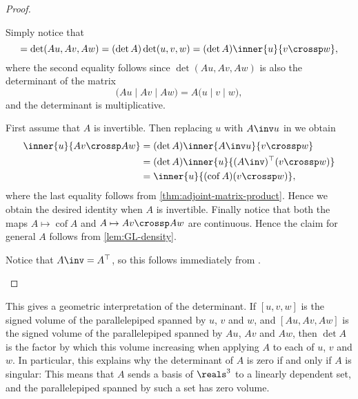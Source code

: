 \documentclass[a4paper, 11pt]{memoir}
\numberwithin{equation}{chapter}
\newcommand{\trans}{^{\top}}
\newcommand{\cof}{\operatorname{cof}}
\begin{document}
\begin{proof}
\begin{proofsec*}
    \item[\Namesubcref{enum:triple-product-transformation}]
    Simply notice that
    \begin{equation*}
        [Au, Av, Aw]
            = \det(Au, Av, Aw)
            = (\det A) \det(u,v,w)
            = (\det A) \inner{u}{v \crossp w},
    \end{equation*}
    where the second equality follows since $\det(Au, Av, Aw)$ is also the determinant of the matrix
    \begin{equation*}
        \bigl( Au \mid Av \mid Aw \bigr)
            = A \bigl( u \mid v \mid w \bigr),
    \end{equation*}
    and the determinant is multiplicative.

    \item[\Namesubcref{enum:cross-product-transformation}]
    First assume that $A$ is invertible. Then replacing $u$ with $A\inv u$ in  we obtain
    \begin{align*}
        \inner{u}{Av \crossp Aw}
            &= (\det A) \inner{A\inv u}{v \crossp w} \\
            &= (\det A) \inner{u}{(A\inv)\trans (v \crossp w)} \\
            &=  \inner{u}{(\cof A)(v \crossp w)},
    \end{align*}
    where the last equality follows from \cref{thm:adjoint-matrix-product}. Hence we obtain the desired identity when $A$ is invertible. Finally notice that both the maps $A \mapsto \cof A$ and $A \mapsto Av \crossp Aw$ are continuous. Hence the claim for general $A$ follows from \cref{lem:GL-density}.

    \item[\Namesubcref{enum:cross-product-orthogonal-transformation}]
    Notice that $A\inv = A\trans$, so this follows immediately from .
\end{proofsec*}
\end{proof}
%
This gives a geometric interpretation of the determinant. If $[u,v,w]$ is the signed volume of the parallelepiped spanned by $u$, $v$ and $w$, and $[Au,Av,Aw]$ is the signed volume of the parallelepiped spanned by $Au$, $Av$ and $Aw$, then $\det A$ is the factor by which this volume increasing when applying $A$ to each of $u$, $v$ and $w$. In particular, this explains why the determinant of $A$ is zero if and only if $A$ is singular: This means that $A$ sends a basis of $\reals^3$ to a linearly dependent set, and the parallelepiped spanned by such a set has zero volume.
\end{document}
